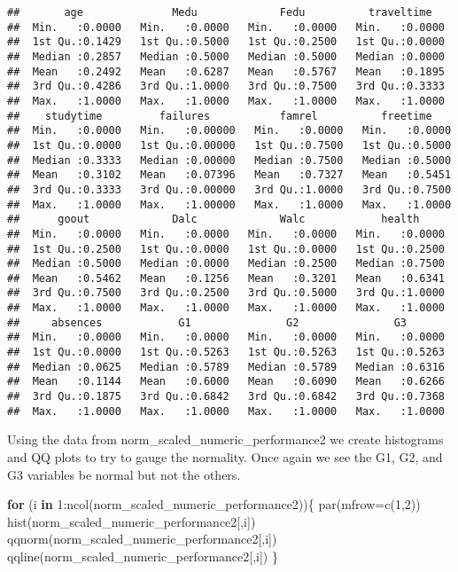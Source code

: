 \documentclass[
]{article}
\newenvironment{Shaded}{\begin{snugshade}}{\end{snugshade}}
\newcommand{\AttributeTok}[1]{\textcolor[rgb]{0.77,0.63,0.00}{#1}}
\newcommand{\ControlFlowTok}[1]{\textcolor[rgb]{0.13,0.29,0.53}{\textbf{#1}}}
\newcommand{\DecValTok}[1]{\textcolor[rgb]{0.00,0.00,0.81}{#1}}
\newcommand{\FunctionTok}[1]{\textcolor[rgb]{0.00,0.00,0.00}{#1}}
\newcommand{\NormalTok}[1]{#1}
\newcommand{\SpecialCharTok}[1]{\textcolor[rgb]{0.00,0.00,0.00}{#1}}
\begin{document}
\begin{verbatim}
##       age              Medu             Fedu          traveltime    
##  Min.   :0.0000   Min.   :0.0000   Min.   :0.0000   Min.   :0.0000  
##  1st Qu.:0.1429   1st Qu.:0.5000   1st Qu.:0.2500   1st Qu.:0.0000  
##  Median :0.2857   Median :0.5000   Median :0.5000   Median :0.0000  
##  Mean   :0.2492   Mean   :0.6287   Mean   :0.5767   Mean   :0.1895  
##  3rd Qu.:0.4286   3rd Qu.:1.0000   3rd Qu.:0.7500   3rd Qu.:0.3333  
##  Max.   :1.0000   Max.   :1.0000   Max.   :1.0000   Max.   :1.0000  
##    studytime         failures           famrel          freetime     
##  Min.   :0.0000   Min.   :0.00000   Min.   :0.0000   Min.   :0.0000  
##  1st Qu.:0.0000   1st Qu.:0.00000   1st Qu.:0.7500   1st Qu.:0.5000  
##  Median :0.3333   Median :0.00000   Median :0.7500   Median :0.5000  
##  Mean   :0.3102   Mean   :0.07396   Mean   :0.7327   Mean   :0.5451  
##  3rd Qu.:0.3333   3rd Qu.:0.00000   3rd Qu.:1.0000   3rd Qu.:0.7500  
##  Max.   :1.0000   Max.   :1.00000   Max.   :1.0000   Max.   :1.0000  
##      goout             Dalc             Walc            health      
##  Min.   :0.0000   Min.   :0.0000   Min.   :0.0000   Min.   :0.0000  
##  1st Qu.:0.2500   1st Qu.:0.0000   1st Qu.:0.0000   1st Qu.:0.2500  
##  Median :0.5000   Median :0.0000   Median :0.2500   Median :0.7500  
##  Mean   :0.5462   Mean   :0.1256   Mean   :0.3201   Mean   :0.6341  
##  3rd Qu.:0.7500   3rd Qu.:0.2500   3rd Qu.:0.5000   3rd Qu.:1.0000  
##  Max.   :1.0000   Max.   :1.0000   Max.   :1.0000   Max.   :1.0000  
##     absences            G1               G2               G3        
##  Min.   :0.0000   Min.   :0.0000   Min.   :0.0000   Min.   :0.0000  
##  1st Qu.:0.0000   1st Qu.:0.5263   1st Qu.:0.5263   1st Qu.:0.5263  
##  Median :0.0625   Median :0.5789   Median :0.5789   Median :0.6316  
##  Mean   :0.1144   Mean   :0.6000   Mean   :0.6090   Mean   :0.6266  
##  3rd Qu.:0.1875   3rd Qu.:0.6842   3rd Qu.:0.6842   3rd Qu.:0.7368  
##  Max.   :1.0000   Max.   :1.0000   Max.   :1.0000   Max.   :1.0000
\end{verbatim}

Using the data from norm\_scaled\_numeric\_performance2 we create
histograms and QQ plots to try to gauge the normality. Once again we see
the G1, G2, and G3 variables be normal but not the others.

\begin{Shaded}
\begin{Highlighting}[]
\ControlFlowTok{for}\NormalTok{ (i }\ControlFlowTok{in} \DecValTok{1}\SpecialCharTok{:}\FunctionTok{ncol}\NormalTok{(norm\_scaled\_numeric\_performance2))\{}
  \FunctionTok{par}\NormalTok{(}\AttributeTok{mfrow=}\FunctionTok{c}\NormalTok{(}\DecValTok{1}\NormalTok{,}\DecValTok{2}\NormalTok{))}
  \FunctionTok{hist}\NormalTok{(norm\_scaled\_numeric\_performance2[,i])}
  \FunctionTok{qqnorm}\NormalTok{(norm\_scaled\_numeric\_performance2[,i])}
  \FunctionTok{qqline}\NormalTok{(norm\_scaled\_numeric\_performance2[,i])}
\NormalTok{\}}
\end{Highlighting}
\end{Shaded}
\end{document}
